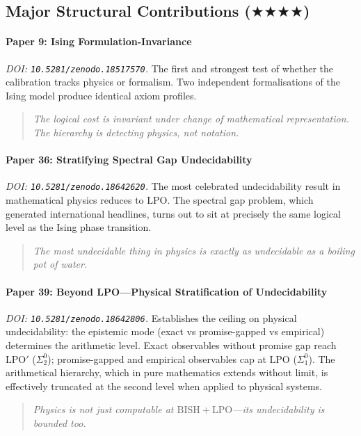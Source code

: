 \documentclass[11pt,a4paper]{report}
\theoremstyle{plain}
\theoremstyle{definition}
\theoremstyle{remark}
\newcommand{\BISH}{\mathrm{BISH}}
\newcommand{\LPO}{\mathrm{LPO}}
\newcommand{\FourStar}{$\bigstar\bigstar\bigstar\bigstar$}
\begin{document}
\subsection{Major Structural Contributions {\normalfont(\FourStar)}}

\paragraph{Paper 9: Ising Formulation-Invariance}
\emph{DOI: \texttt{10.5281/zenodo.18517570}.}\quad
The first and strongest test of whether the calibration tracks physics or formalism.  Two independent formalisations of the Ising model produce identical axiom profiles.
\begin{quote}\itshape
The logical cost is invariant under change of mathematical representation.  The hierarchy is detecting physics, not notation.
\end{quote}

\paragraph{Paper 36: Stratifying Spectral Gap Undecidability}
\emph{DOI: \texttt{10.5281/zenodo.18642620}.}\quad
The most celebrated undecidability result in mathematical physics reduces to $\LPO$.  The spectral gap problem, which generated international headlines, turns out to sit at precisely the same logical level as the Ising phase transition.
\begin{quote}\itshape
The most undecidable thing in physics is exactly as undecidable as a boiling pot of water.
\end{quote}

\paragraph{Paper 39: Beyond LPO---Physical Stratification of Undecidability}
\emph{DOI: \texttt{10.5281/zenodo.18642806}.}\quad
Establishes the ceiling on physical undecidability: the epistemic mode (exact vs promise-gapped vs empirical) determines the arithmetic level.  Exact observables without promise gap reach $\LPO'$ ($\Sigma^0_2$); promise-gapped and empirical observables cap at $\LPO$ ($\Sigma^0_1$).  The arithmetical hierarchy, which in pure mathematics extends without limit, is effectively truncated at the second level when applied to physical systems.
\begin{quote}\itshape
Physics is not just computable at $\BISH+\LPO$---its undecidability is bounded too.
\end{quote}
\end{document}
